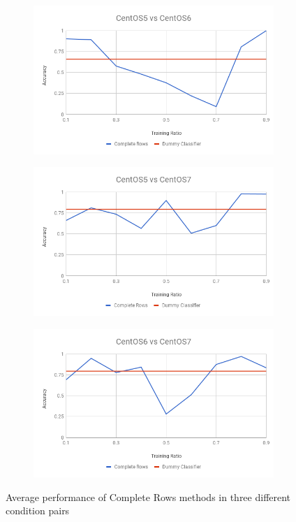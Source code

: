 \documentclass[10pt, conference, compsocconf]{IEEEtran}
\begin{document}
\begin{figure}[h!]
        \centering
        \begin{subfigure}[b]{0.8\linewidth}
                \includegraphics[width=\columnwidth]{figures/ALS/rows-ALS-5vs6-PFS}
        \end{subfigure}
        \begin{subfigure}[b]{0.8\linewidth}
                \includegraphics[width=\columnwidth]{figures/ALS/rows-ALS-5vs7-PFS}
        \end{subfigure}
        \begin{subfigure}[b]{0.8\linewidth}
                \includegraphics[width=\columnwidth]{figures/ALS/rows-ALS-6vs7-PFS}
        \end{subfigure}
        \caption{Average performance of Complete Rows methods in three different condition pairs}
        \label{fig:rows method}
\end{figure}
\end{document}
